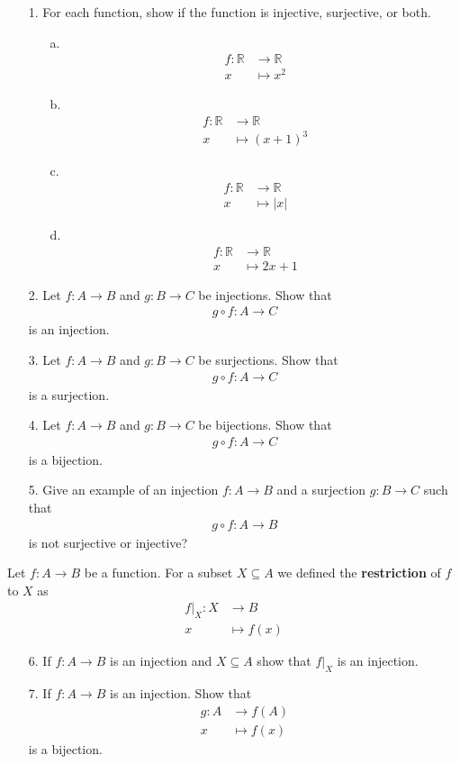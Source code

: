 \documentclass{article}
\begin{document}
\begin{itemize}
\item [1.] For each function, show if the function is injective, surjective, or both.
  \begin{itemize}
    \item [a.]
    \begin{align*}
    f: \mathbb{R} &\to \mathbb{R}\\
    x &\mapsto x^2
    \end{align*}
    \item [b.]
    \begin{align*}
    f: \mathbb{R} &\to \mathbb{R}\\
    x &\mapsto (x+1)^3
    \end{align*}
    \item [c.]
    \begin{align*}
    f: \mathbb{R} &\to \mathbb{R}\\
      x &\mapsto |x|
    \end{align*}
    \item [d.]
    \begin{align*}
    f: \mathbb{R} &\to \mathbb{R}\\
    x &\mapsto 2x+1
    \end{align*}
  \end{itemize}
\item [2.] Let $f: A\to B$ and $g: B\to C$ be injections. Show that
  \begin{align*}
    g\circ f: A \to C
  \end{align*}
  is an injection.
\item [3.] Let $f: A\to B$ and $g: B\to C$ be surjections. Show that
  \begin{align*}
    g\circ f: A \to C
  \end{align*}
  is a surjection.
\item [4.] Let $f: A\to B$ and $g: B\to C$ be bijections. Show that
  \begin{align*}
    g\circ f: A \to C
  \end{align*}
  is a bijection.
\item [5.] Give an example of an injection $f:A \to B$ and a surjection $g: B \to C$ such that
  \begin{align*}
    g\circ f: A \to B
  \end{align*}
  is not surjective or injective?
\end{itemize}

Let $f: A \to B$ be a function. For a subset $X\subseteq{A}$ we defined the \textbf{restriction} of $f$ to $X$ as
\begin{align*}
  f|_X: X &\to B\\
  x &\mapsto f(x)
\end{align*}
\begin{itemize}
\item [6.] If $f: A \to B$ is an injection and $X\subseteq{A}$ show that $f|_X$ is an injection.
\item [7.] If $f: A \to B$ is an injection. Show that
  \begin{align*}
    g: A &\to f(A)\\
    x &\mapsto f(x)
  \end{align*}
  is a bijection.
\end{itemize}
\end{document}

